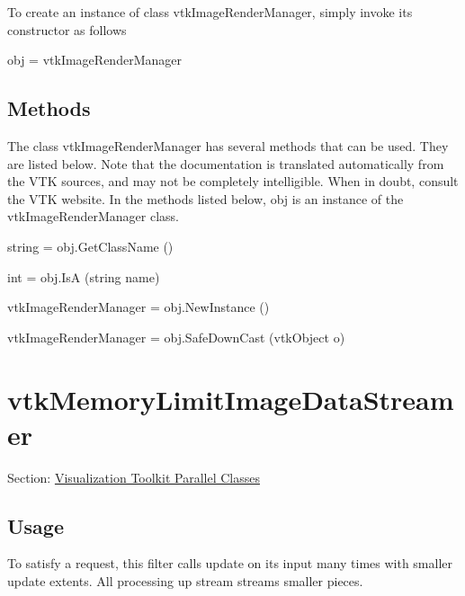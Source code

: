 To create an instance of class vtk\-Image\-Render\-Manager, simply invoke its constructor as follows \begin{DoxyVerb}  obj = vtkImageRenderManager
\end{DoxyVerb}
 \hypertarget{vtkwidgets_vtkxyplotwidget_Methods}{}\subsection{Methods}\label{vtkwidgets_vtkxyplotwidget_Methods}
The class vtk\-Image\-Render\-Manager has several methods that can be used. They are listed below. Note that the documentation is translated automatically from the V\-T\-K sources, and may not be completely intelligible. When in doubt, consult the V\-T\-K website. In the methods listed below, {\ttfamily obj} is an instance of the vtk\-Image\-Render\-Manager class. 
\begin{DoxyItemize}
\item {\ttfamily string = obj.\-Get\-Class\-Name ()}  
\item {\ttfamily int = obj.\-Is\-A (string name)}  
\item {\ttfamily vtk\-Image\-Render\-Manager = obj.\-New\-Instance ()}  
\item {\ttfamily vtk\-Image\-Render\-Manager = obj.\-Safe\-Down\-Cast (vtk\-Object o)}  
\end{DoxyItemize}\hypertarget{vtkparallel_vtkmemorylimitimagedatastreamer}{}\section{vtk\-Memory\-Limit\-Image\-Data\-Streamer}\label{vtkparallel_vtkmemorylimitimagedatastreamer}
Section\-: \hyperlink{sec_vtkparallel}{Visualization Toolkit Parallel Classes} \hypertarget{vtkwidgets_vtkxyplotwidget_Usage}{}\subsection{Usage}\label{vtkwidgets_vtkxyplotwidget_Usage}
To satisfy a request, this filter calls update on its input many times with smaller update extents. All processing up stream streams smaller pieces.

